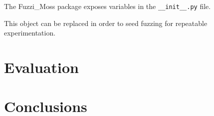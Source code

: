 \documentclass{sig-alternate}
\begin{document}

The Fuzzi\_Moss package exposes variables in the \verb!__init__.py! file.

  This
  object can be replaced in order to seed fuzzing for repeatable
  experimentation.


\section{Evaluation}



\section{Conclusions}






\end{document}
